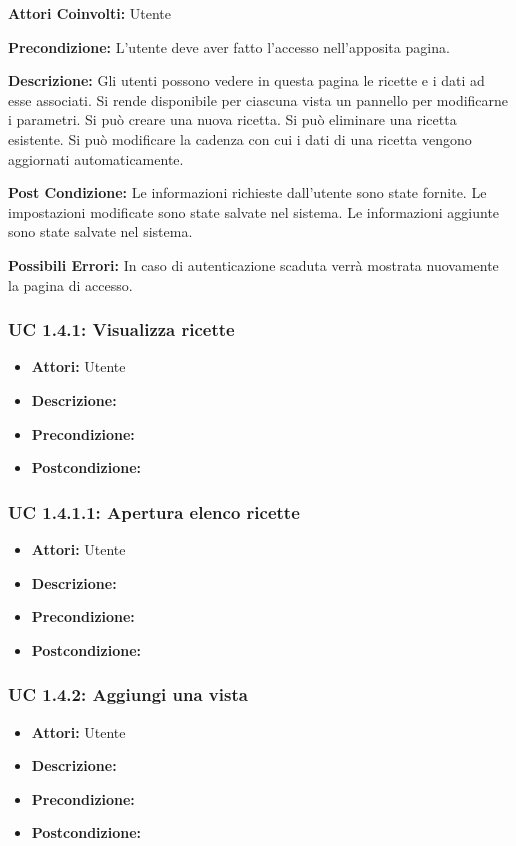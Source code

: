\textbf{Attori Coinvolti:}
Utente

\textbf{Precondizione:}
L’utente deve aver fatto l’accesso nell’apposita pagina.

\textbf{Descrizione:}
Gli utenti possono vedere in questa pagina le ricette e i dati ad esse associati. 
Si rende disponibile per ciascuna vista un pannello per modificarne i parametri. 
Si può creare una nuova ricetta. 
Si può eliminare una ricetta esistente.
Si può modificare la cadenza con cui i dati di una ricetta vengono aggiornati automaticamente.

\textbf{Post Condizione:}
Le informazioni richieste dall'utente sono state fornite.
Le impostazioni modificate sono state salvate nel sistema.
Le informazioni aggiunte sono state salvate nel sistema.

\textbf{Possibili Errori:}
In caso di autenticazione scaduta verrà mostrata nuovamente la pagina di accesso.

\subsubsection{UC 1.4.1: Visualizza ricette}

\begin{itemize}
\item \textbf{Attori:} Utente
\item \textbf{Descrizione:} 
\item \textbf{Precondizione:} 
\item \textbf{Postcondizione:} 
\end{itemize}

\subsubsection{UC 1.4.1.1: Apertura elenco ricette}

\begin{itemize}
\item \textbf{Attori:} Utente
\item \textbf{Descrizione:} 
\item \textbf{Precondizione:} 
\item \textbf{Postcondizione:} 
\end{itemize}

\subsubsection{UC 1.4.2: Aggiungi una vista}

\begin{itemize}
\item \textbf{Attori:} Utente
\item \textbf{Descrizione:} 
\item \textbf{Precondizione:} 
\item \textbf{Postcondizione:} 
\end{itemize}

